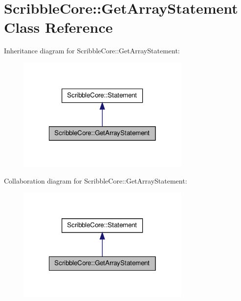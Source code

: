 \hypertarget{class_scribble_core_1_1_get_array_statement}{\section{Scribble\-Core\-:\-:Get\-Array\-Statement Class Reference}
\label{class_scribble_core_1_1_get_array_statement}
}


Inheritance diagram for Scribble\-Core\-:\-:Get\-Array\-Statement\-:
\nopagebreak
\begin{figure}[H]
\begin{center}
\leavevmode
\includegraphics[width=242pt]{class_scribble_core_1_1_get_array_statement__inherit__graph}
\end{center}
\end{figure}


Collaboration diagram for Scribble\-Core\-:\-:Get\-Array\-Statement\-:
\nopagebreak
\begin{figure}[H]
\begin{center}
\leavevmode
\includegraphics[width=242pt]{class_scribble_core_1_1_get_array_statement__coll__graph}
\end{center}
\end{figure}
